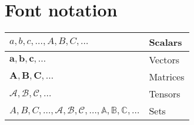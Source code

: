 \section{Font notation}
\begin{xltabular}{\textwidth}{XX}
	$a,b,c, \dots, A, B, C, \dots$                                                                            & Scalars  \\ \hline
	$\mathbf{a}, \mathbf{b}, \mathbf{c}, \dots$                                                               & Vectors  \\ \hline
	$\mathbf{A}, \mathbf{B}, \mathbf{C}, \dots$                                                               & Matrices \\ \hline
	$\pmb{\mathcal{A}}, \pmb{\mathcal{B}}, \pmb{\mathcal{C}}, \dots$                                          & Tensors  \\ \hline
	$A, B, C, \dots, \mathcal{A}, \mathcal{B}, \mathcal{C}, \dots, \mathbb{A}, \mathbb{B}, \mathbb{C}, \dots$ & Sets     \\
\end{xltabular}